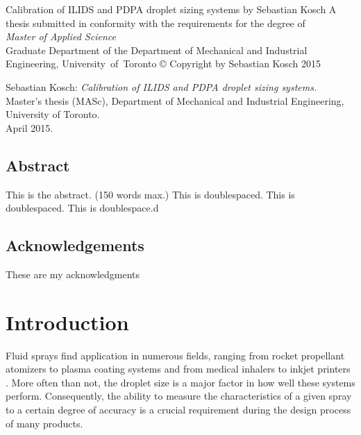 \documentclass[11.5pt,oneside]{book}
\begin{document}
\frontmatter
%
\thispagestyle{empty}
\begin{center}
  \vskip 1in
  Calibration of ILIDS and PDPA droplet sizing systems
  \vskip 1.2in
  by
  \vskip 1.2in 
  Sebastian Kosch
  \vskip 2in
  A thesis submitted in conformity with the requirements for the degree of\\
  \emph{Master of Applied Science}\\[2ex]
  Graduate Department of the Department of Mechanical and Industrial
  Engineering, University~of~Toronto
  \vskip 1.3in
  © Copyright by Sebastian Kosch 2015
\end{center}

\pagebreak
\noindent Sebastian Kosch: \emph{Calibration of ILIDS and PDPA droplet sizing systems.}\\
Master's thesis (MASc), Department of Mechanical and Industrial Engineering,\\
University of Toronto.\\
April 2015.

\section*{Abstract}
\thispagestyle{plain}
\begin{doublespace}
This is the abstract. (150 words max.) This is doublespaced. This is
doublespaced. This is doublespace.d
\end{doublespace}
\vfill
\pagebreak
\section*{Acknowledgements}
\thispagestyle{plain}
These are my acknowledgments
\vfill
\tableofcontents
\listoftables
\listoffigures
\printnomenclature[5em]

\mainmatter \pagestyle{fancy} \chapter{Introduction}
Fluid sprays find application in numerous fields, ranging from rocket propellant
atomizers \citep{Inoue08, Mehegan71} to plasma coating systems
\citep{Fauchais04} and from medical inhalers \citep{Newman05} to inkjet
printers \citep{Endo88}. More often than not, the droplet size is a major factor in how well
these systems perform. Consequently, the ability to measure the characteristics
of a given spray to a certain degree of accuracy is a crucial requirement
during the design process of many products.
\end{document}
